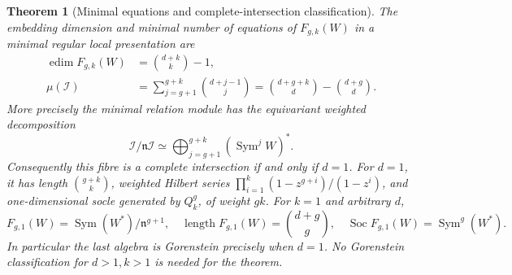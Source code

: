 \documentclass[11pt,reqno]{amsart}
\numberwithin{equation}{section}
\newtheorem{theorem}{Theorem}[section]
\theoremstyle{definition}\newtheorem{definition}[theorem]{Definition}
\theoremstyle{remark}\newtheorem{remark}[theorem]{Remark}
\DeclareMathOperator{\Sym}{Sym}\DeclareMathOperator{\Gr}{Gr}
\DeclareMathOperator{\length}{length}
\begin{document}
\begin{theorem}[Minimal equations and complete-intersection classification]
\label{thm:reciprocal-structure-v153}
The embedding dimension and minimal number of equations of
$F_{g,k}(W)$ in a minimal regular local presentation are
\begin{align}
 \operatorname{edim}F_{g,k}(W)&=\binom{d+k}{k}-1,\label{eq:edim-v153}\\
 \mu(\mathcal I)&=\sum_{j=g+1}^{g+k}\binom{d+j-1}{j}
                  =\binom{d+g+k}{d}-\binom{d+g}{d}.
                  \label{eq:minrels-v153}
\end{align}
More precisely the minimal relation module has the equivariant
weighted decomposition
\begin{equation}\label{eq:relation-module-v153}
 \mathcal I/\mathfrak n\mathcal I
                 \simeq\bigoplus_{j=g+1}^{g+k}(\Sym^jW)^*.
\end{equation}
Consequently this fibre is a complete intersection if and only if
$d=1$. For $d=1$, it has length $\binom{g+k}{k}$, weighted Hilbert
series $\prod_{i=1}^k(1-z^{g+i})/(1-z^i)$, and one-dimensional
socle generated by $Q_k^g$, of weight $gk$.
For $k=1$ and arbitrary $d$,
\begin{equation}\label{eq:k-one-v153}
 F_{g,1}(W)=\Sym(W^*)/\mathfrak n^{g+1},\quad
 \length F_{g,1}(W)=\binom{d+g}{g},\quad
 \operatorname{Soc}F_{g,1}(W)=\Sym^g(W^*).
\end{equation}
In particular the last algebra is Gorenstein precisely when $d=1$.
No Gorenstein classification for $d>1,k>1$ is needed for the theorem.
\end{theorem}
\end{document}
